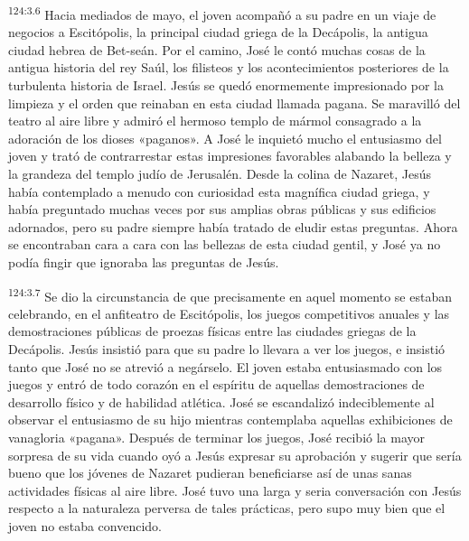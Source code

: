 \par 
\textsuperscript{124:3.6} Hacia mediados de mayo, el joven acompañó a su padre en un viaje de negocios a Escitópolis, la principal ciudad griega de la Decápolis, la antigua ciudad hebrea de Bet-seán. Por el camino, José le contó muchas cosas de la antigua historia del rey Saúl, los filisteos y los acontecimientos posteriores de la turbulenta historia de Israel. Jesús se quedó enormemente impresionado por la limpieza y el orden que reinaban en esta ciudad llamada pagana. Se maravilló del teatro al aire libre y admiró el hermoso templo de mármol consagrado a la adoración de los dioses «paganos». A José le inquietó mucho el entusiasmo del joven y trató de contrarrestar estas impresiones favorables alabando la belleza y la grandeza del templo judío de Jerusalén. Desde la colina de Nazaret, Jesús había contemplado a menudo con curiosidad esta magnífica ciudad griega, y había preguntado muchas veces por sus amplias obras públicas y sus edificios adornados, pero su padre siempre había tratado de eludir estas preguntas. Ahora se encontraban cara a cara con las bellezas de esta ciudad gentil, y José ya no podía fingir que ignoraba las preguntas de Jesús.

\par 
\textsuperscript{124:3.7} Se dio la circunstancia de que precisamente en aquel momento se estaban celebrando, en el anfiteatro de Escitópolis, los juegos competitivos anuales y las demostraciones públicas de proezas físicas entre las ciudades griegas de la Decápolis. Jesús insistió para que su padre lo llevara a ver los juegos, e insistió tanto que José no se atrevió a negárselo. El joven estaba entusiasmado con los juegos y entró de todo corazón en el espíritu de aquellas demostraciones de desarrollo físico y de habilidad atlética. José se escandalizó indeciblemente al observar el entusiasmo de su hijo mientras contemplaba aquellas exhibiciones de vanagloria «pagana». Después de terminar los juegos, José recibió la mayor sorpresa de su vida cuando oyó a Jesús expresar su aprobación y sugerir que sería bueno que los jóvenes de Nazaret pudieran beneficiarse así de unas sanas actividades físicas al aire libre. José tuvo una larga y seria conversación con Jesús respecto a la naturaleza perversa de tales prácticas, pero supo muy bien que el joven no estaba convencido.

